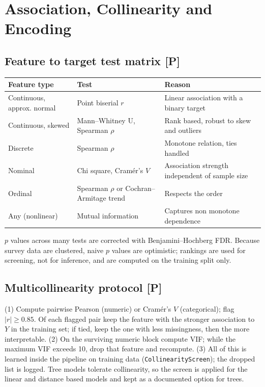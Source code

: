 \documentclass[11pt,a4paper]{article}
\newcommand{\Pl}{\textbf{[P]}}   %
\begin{document}
\section{Association, Collinearity and Encoding}
\subsection{Feature to target test matrix \Pl}
\begin{center}\small
\begin{tabular}{@{}p{3.4cm}p{3.4cm}p{7.5cm}@{}}\toprule
Feature type & Test & Reason\\\midrule
Continuous, approx. normal & Point biserial $r$ & Linear association with a binary target\\
Continuous, skewed & Mann--Whitney U, Spearman $\rho$ & Rank based, robust to skew and outliers\\
Discrete & Spearman $\rho$ & Monotone relation, ties handled\\
Nominal & Chi square, Cram\'er's $V$ & Association strength independent of sample size\\
Ordinal & Spearman $\rho$ or Cochran--Armitage trend & Respects the order\\
Any (nonlinear) & Mutual information & Captures non monotone dependence\\\bottomrule
\end{tabular}\end{center}
$p$ values across many tests are corrected with Benjamini--Hochberg FDR. Because survey data are clustered, naive $p$ values are optimistic; rankings are used for screening, not for inference, and are computed on the training split only.

\subsection{Multicollinearity protocol \Pl}
(1) Compute pairwise Pearson (numeric) or Cram\'er's $V$ (categorical); flag $|r|\ge0.85$. Of each flagged pair keep the feature with the stronger association to $Y$ in the training set; if tied, keep the one with less missingness, then the more interpretable. (2) On the surviving numeric block compute VIF; while the maximum VIF exceeds 10, drop that feature and recompute. (3) All of this is learned inside the pipeline on training data (\texttt{CollinearityScreen}); the dropped list is logged. Tree models tolerate collinearity, so the screen is applied for the linear and distance based models and kept as a documented option for trees.
\end{document}
